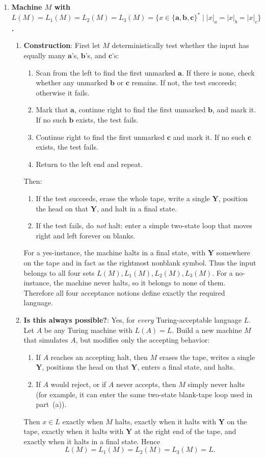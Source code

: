 \begin{enumerate}[{11.}1. ]
\item \textbf{Machine $M$ with $L(M)=L_1(M)=L_2(M)=L_3(M)=\{x\in\{\pmb{a},\pmb{b},\pmb{c}\}^*\mid |x|_a=|x|_b=|x|_c\}$.}

\begin{enumerate}
\item \textbf{Construction}: First let $M$ deterministically test whether the
input has equally many $\pmb{a}$'s, $\pmb{b}$'s, and $\pmb{c}$'s:
\begin{enumerate}[1.]
\item Scan from the left to find the first unmarked $\pmb{a}$. If there is none,
check whether any unmarked $\pmb{b}$ or $\pmb{c}$ remains. If not, the test
succeeds; otherwise it fails.
\item Mark that $\pmb{a}$, continue right to find the first unmarked $\pmb{b}$,
and mark it. If no such $\pmb{b}$ exists, the test fails.
\item Continue right to find the first unmarked $\pmb{c}$ and mark it. If no
such $\pmb{c}$ exists, the test fails.
\item Return to the left end and repeat.
\end{enumerate}
Then:
\begin{enumerate}[1.]
\item If the test succeeds, erase the whole tape, write a single $\pmb{Y}$, position the head on that $\pmb{Y}$, and halt in a final state.
\item If the test fails, do \emph{not} halt: enter a simple two-state loop that moves right and left forever on blanks.
\end{enumerate}
For a yes-instance, the machine halts in a final state, with $\pmb{Y}$ somewhere on the tape and in fact as the rightmost nonblank symbol. Thus the input belongs to all four sets $L(M),L_1(M),L_2(M),L_3(M)$. For a no-instance, the machine never halts, so it belongs to none of them. Therefore all four acceptance notions define exactly the required language.

\item \textbf{Is this always possible?}: Yes, for \emph{every} Turing-acceptable
language $L$. Let $A$ be any Turing machine with $L(A)=L$. Build a new machine
$M$ that simulates $A$, but modifies only the accepting behavior:
\begin{enumerate}[1.]
\item If $A$ reaches an accepting halt, then $M$ erases the tape, writes a single
$\pmb{Y}$, positions the head on that $\pmb{Y}$, enters a final state, and halts.
\item If $A$ would reject, or if $A$ never accepts, then $M$ simply never halts
(for example, it can enter the same two-state blank-tape loop used in part~(a)).
\end{enumerate}
Then $x\in L$ exactly when $M$ halts, exactly when it halts with $\pmb{Y}$ on the
tape, exactly when it halts with $\pmb{Y}$ at the right end of the tape, and
exactly when it halts in a final state. Hence
\[
L(M)=L_1(M)=L_2(M)=L_3(M)=L.
\]
\end{enumerate}


\end{enumerate}
